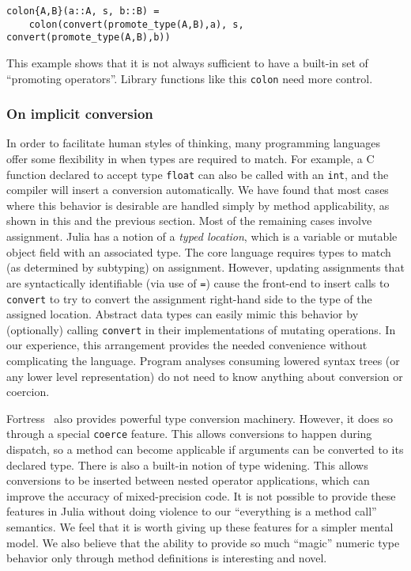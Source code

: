 \begin{verbatim}
colon{A,B}(a::A, s, b::B) =
    colon(convert(promote_type(A,B),a), s, convert(promote_type(A,B),b))
\end{verbatim}

This example shows that it is not always sufficient to have a built-in set of
``promoting operators''.
Library functions like this \texttt{colon} need more control.

\subsubsection{On implicit conversion}

In order to facilitate human styles of thinking, many programming languages offer
some flexibility in when types are required to match.
For example, a C function declared to accept type \texttt{float}
can also be called with an \texttt{int}, and the compiler will
insert a conversion automatically.
We have found that most cases where this behavior is desirable
are handled simply by method applicability, as shown in this and the
previous section.
Most of the remaining cases involve assignment.
Julia has a notion of a \emph{typed location}, which is a variable
or mutable object field with an associated type.
The core language requires types to match (as determined by subtyping)
on assignment.
However, updating assignments that are syntactically identifiable
(via use of \texttt{=}) cause the front-end to insert calls to
\texttt{convert} to try to convert the assignment right-hand side
to the type of the assigned location.
Abstract data types can easily mimic this behavior by (optionally)
calling \texttt{convert} in their implementations of mutating
operations.
In our experience, this arrangement provides the needed convenience
without complicating the language.
Program analyses consuming lowered syntax trees (or any lower level
representation) do not need to know anything about conversion
or coercion.

Fortress~\cite{fortresspec} also provides powerful type conversion
machinery.
However, it does so through a special \texttt{coerce} feature.
This allows conversions to happen during dispatch, so a method can
become applicable if arguments can be converted to its declared type.
There is also a built-in notion of type widening.
This allows conversions to be inserted between nested operator
applications, which can improve the accuracy of mixed-precision code.
It is not possible to provide these features in Julia without doing
violence to our ``everything is a method call'' semantics.
We feel that it is worth giving up these features for a simpler
mental model.
We also believe that the ability to provide so much ``magic'' numeric
type behavior only through method definitions is interesting and novel.

